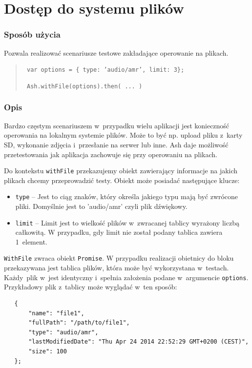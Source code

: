 \documentclass[brudnopis]{xmgr}
\begin{document}
\section{Dostęp do systemu plików}

\subsubsection{Sposób użycia}
Pozwala realizować scenariusze testowe zakładające operowanie na plikach.

\begin{quote}
  \texttt{  var options = \{ type: 'audio/amr', limit: 3\};  }

  \texttt{  Ash.withFile(options).then( ... )  }
\end{quote}

\subsubsection{Opis}

Bardzo częstym scenariuszem w~przypadku wielu aplikacji jest konieczność operowania na lokalnym systemie plików. Może to być np. upload pliku z~karty SD, wykonanie zdjęcia i~przesłanie na serwer lub inne. Ash daje możliwość przetestowania jak aplikacja zachowuje się przy operowaniu na plikach.  

Do kontekstu \texttt{withFile} przekazujemy obiekt zawierający informacje na jakich plikach chcemy przeprowadzić testy. Obiekt może posiadać następujące klucze:

\begin{itemize}
  \item \texttt{type} -- Jest to ciąg znaków, który określa jakiego typu mają być zwrócone pliki. Domyślnie jest to 'audio/amr' czyli plik dźwiękowy. 
  \item \texttt{limit} -- Limit jest to wielkość plików w~zwracanej tablicy wyrażony liczbą całkowitą. W przypadku, gdy limit nie został podany tablica zawiera 1~element. 
\end{itemize}

\texttt{WithFile} zwraca obiekt \texttt{Promise}. W przypadku realizacji obietnicy do bloku przekazywana jest tablica plików, która może być wykorzystana w~testach. Każdy~plik w~jest identyczny i~spełnia założenia podane w~argumencie \texttt{options}. Przykładowy plik z~tablicy może wyglądać w~ten sposób:

\begin{lstlisting}
   {
       "name": "file1",
       "fullPath": "/path/to/file1",
       "type": "audio/amr",
       "lastModifiedDate": "Thu Apr 24 2014 22:52:29 GMT+0200 (CEST)",
       "size": 100
   };
\end{lstlisting}
\end{document}
